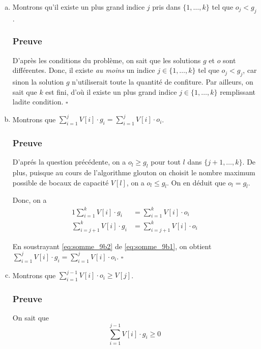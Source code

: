 \documentclass[12pt,a4paper]{article}
\begin{document}
\begin{enumerate}[a)]
 \item Montrons qu'il existe un plus grand indice $j$ pris dans $\{1,\dotsc,k\}$ tel que $o_j < g_j$.
 
 \subsubsection*{Preuve}
 D'apr\`es les conditions du probl\`eme, on sait que les solutions $g$ et $o$ sont diff\'erentes. Donc, il existe {\itshape au moins} un indice $j \in \{1,\dotsc,k\}$ tel que $o_j < g_j$, car sinon la solution $g$ n'utiliserait toute la quantit\'e de confiture. Par ailleurs, on sait que $k$ est fini, d'o\`u il existe un plus grand indice $j \in \{1,\dotsc,k\}$ remplissant ladite condition. \hfill\ensuremath{\square}
 
 \item Montrons que \( \displaystyle\sum_{i=1}^{j} V[i]\cdot g_i = \displaystyle\sum_{i=1}^{j} V[i]\cdot o_i\).
 
 \subsubsection*{Preuve}
 D'apr\'es la question pr\'ec\'edente, on a $o_l \geq g_l$ pour tout $l$ dans $\{j+1,\dotsc, k\}$. De plus, puisque au cours de l'algorithme glouton on choisit le nombre maximum possible de bocaux de capacit\'e $V[l]$, on a $o_l \leq g_l$. On en d\'eduit que $o_l = g_l$.
 
 Donc, on a
 \begin{alignat}{1}
    \displaystyle\sum_{i=1}^{k} V[i]\cdot g_i &= \displaystyle\sum_{i=1}^{k} V[i]\cdot o_i \label{eq:somme_9b1} \\
    \displaystyle\sum_{i=j+1}^{k} V[i]\cdot g_i &= \displaystyle\sum_{i=j+1}^{k} V[i]\cdot o_i \label{eq:somme_9b2}
 \end{alignat}
 
 En soustrayant \eqref{eq:somme_9b2} de \eqref{eq:somme_9b1}, on obtient \( \displaystyle\sum_{i=1}^{j} V[i]\cdot g_i = \displaystyle\sum_{i=1}^{j} V[i]\cdot o_i\). \hfill\ensuremath{\square}
 
 \item Montrons que \( \displaystyle\sum_{i=1}^{j-1} V[i]\cdot o_i \geq V[j]\).
 
 \subsubsection*{Preuve}
 On sait que 
 \begin{equation*}
    \displaystyle\sum_{i=1}^{j-1} V[i]\cdot g_i \geq 0
 \end{equation*}


\end{enumerate}
\end{document}
